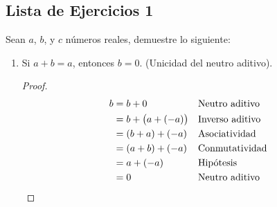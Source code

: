 \documentclass[11pt]{article}
\begin{document}
\subsection*{Lista de Ejercicios 1}

Sean $a$, $b$, y $c$ números reales, demuestre lo siguiente:

\begin{enumerate}[label=\alph*)]
 \item Si $a+b=a$, entonces $b=0$. (Unicidad del neutro aditivo).
 \begin{proof}
  \begin{align*}
  b &= b + 0 && \text{Neutro aditivo}\\
  &= b + \bigl(a+(-a)\bigr) && \text{Inverso aditivo}\\
  &= (b+a) + (-a) && \text{Asociatividad}\\
  &= (a+b) + (-a) && \text{Conmutatividad}\\
  &= a + (-a) && \text{Hipótesis}\\
  &= 0 && \text{Neutro aditivo} \qedhere
  \end{align*}
 \end{proof}\vspace{-1em}
 

\end{enumerate}
\end{document}

